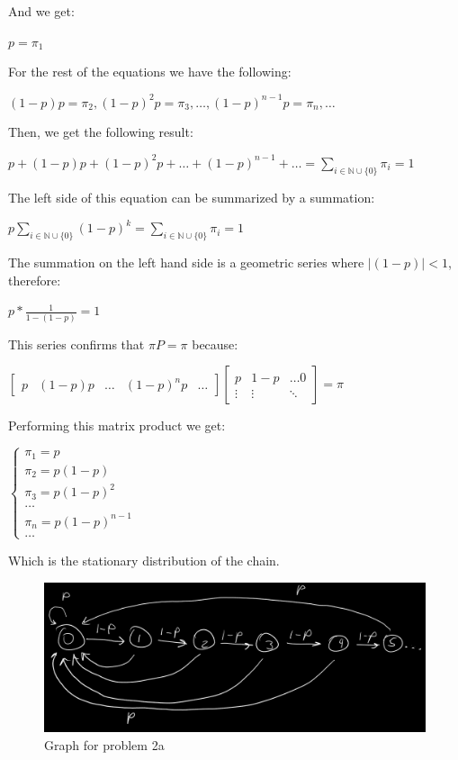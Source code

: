 \documentclass[]{article}
\begin{document}
And we get:

\(p = \pi_{1}\)

For the rest of the equations we have the following:

\((1 - p)p = \pi_{2}, (1 - p)^{2} p = \pi_{3}, \dots, (1 - p)^{n-1} p = \pi_{n}, \dots\)

Then, we get the following result:

\(p + (1-p)p + (1-p)^{2} p + \dots + (1-p)^{n-1} + \dots = \sum_{i \in \mathbb{N} \cup \{0\}} \pi_{i} = 1\)

The left side of this equation can be summarized by a summation:

\(p \sum_{i \in \mathbb{N} \cup \{0\}} (1-p)^{k} = \sum_{i \in \mathbb{N} \cup \{0\}} \pi_{i} = 1\)

The summation on the left hand side is a geometric series where
\(|(1-p)| < 1\), therefore:

\(p * \frac{1}{1 - (1 - p)} = 1\)

This series confirms that \(\pi P = \pi\) because:

\(\begin{bmatrix} p & (1 - p)p & \dots & (1 - p)^{n} p & \dots \end{bmatrix} \begin{bmatrix} p & 1-p & \dots 0 \\ \vdots & \vdots & \ddots \end{bmatrix} = \pi\)

Performing this matrix product we get:

\(\begin{cases} \pi_{1} = p \\ \pi_{2} = p (1-p) \\ \pi_{3} = p (1-p)^{2} \\ \dots \\ \pi_{n} = p (1-p)^{n-1} \\ \dots \end{cases}\)

Which is the stationary distribution of the chain.

\begin{figure}
\centering
\includegraphics{./grafo2.png}
\caption{Graph for problem 2a}
\end{figure}
\end{document}
